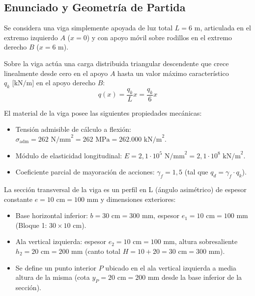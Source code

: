 \subsection{Enunciado y Geometría de Partida}

Se considera una viga simplemente apoyada de luz total $L = 6\text{ m}$, articulada en el extremo izquierdo $A$ ($x = 0$) y con apoyo móvil sobre rodillos en el extremo derecho $B$ ($x = 6\text{ m}$).

Sobre la viga actúa una carga distribuida triangular descendente que crece linealmente desde cero en el apoyo $A$ hasta un valor máximo característico $q_k\text{ [kN/m]}$ en el apoyo derecho $B$:
\begin{equation}
    q(x) = \frac{q_k}{L} x = \frac{q_k}{6} x
\end{equation}

El material de la viga posee las siguientes propiedades mecánicas:
\begin{itemize}
    \item Tensión admisible de cálculo a flexión: $\sigma_{\text{adm}} = 262\text{ N/mm}^2 = 262\text{ MPa} = 262.000\text{ kN/m}^2$.
    \item Módulo de elasticidad longitudinal: $E = 2{,}1 \cdot 10^5\text{ N/mm}^2 = 2{,}1 \cdot 10^8\text{ kN/m}^2$.
    \item Coeficiente parcial de mayoración de acciones: $\gamma_f = 1{,}5$ (tal que $q_d = \gamma_f \cdot q_k$).
\end{itemize}

La sección transversal de la viga es un perfil en L (ángulo asimétrico) de espesor constante $e = 10\text{ cm} = 100\text{ mm}$ y dimensiones exteriores:
\begin{itemize}
    \item Base horizontal inferior: $b = 30\text{ cm} = 300\text{ mm}$, espesor $e_1 = 10\text{ cm} = 100\text{ mm}$ (Bloque 1: $30 \times 10\text{ cm}$).
    \item Ala vertical izquierda: espesor $e_2 = 10\text{ cm} = 100\text{ mm}$, altura sobresaliente $h_2 = 20\text{ cm} = 200\text{ mm}$ (canto total $H = 10 + 20 = 30\text{ cm} = 300\text{ mm}$).
    \item Se define un punto interior $P$ ubicado en el ala vertical izquierda a media altura de la misma (cota $y_P = 20\text{ cm} = 200\text{ mm}$ desde la base inferior de la sección).
\end{itemize}

